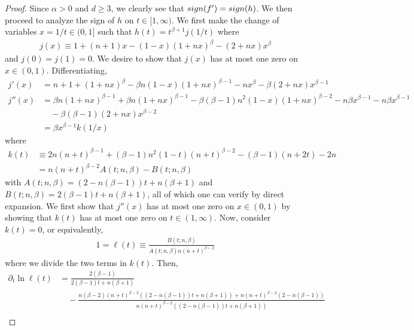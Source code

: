 \documentclass[10pt,a4paper]{amsart}
\newcommand{\p}{\partial}
\begin{document}
\begin{proof}
Since $\alpha>0$ and $d\geq 3$, we clearly see that ${\rm sign}(f')={\rm sign}(h)$. We then proceed to analyze the sign of $h$ on $t\in [1,\infty)$. We first make the change of variables $x=1/t\in (0,1]$ such that $h(t)=t^{\beta+1}j(1/t)$ where
\begin{align*}
    j(x)\equiv 1+(n+1)x-(1-x)(1+nx)^\beta -(2+nx)x^\beta 
\end{align*}
and $j(0)=j(1)=0$. We desire to show that $j(x)$ has at most one zero on $x\in (0,1)$. Differentiating,
\begin{align*}
    j'(x)&=n+1+(1+nx)^\beta -\beta n(1-x)(1+nx)^{\beta-1} -nx^\beta -\beta(2+nx)x^{\beta-1} \\
    j''(x)&=\beta n(1+nx)^{\beta-1}+\beta n (1+nx)^{\beta-1} -\beta(\beta-1)n^2 (1-x)(1+nx)^{\beta-2} -n\beta x^{\beta-1}-n\beta x^{\beta-1}\\
    &\quad -\beta(\beta-1)(2+nx)x^{\beta-2}\\
    &=\beta x^{\beta-1}k(1/x)
\end{align*}
where
\begin{align*}
    k(t)&\equiv 2n(n+t)^{\beta-1}+(\beta-1)n^2 (1-t)(n+t)^{\beta-2}-(\beta-1)(n+2t)-2n\\
    &=n(n+t)^{\beta-2}A(t;n,\beta)-B(t;n,\beta)
\end{align*}
with $A(t;n,\beta)=(2-n(\beta-1))t+n(\beta+1)$ and $B(t;n,\beta)=2(\beta-1)t+n(\beta+1)$, all of which one can verify by direct expansion.
We first show that $j''(x)$ has at most one zero on $x\in (0,1)$ by showing that $k(t)$ has at most one zero on $t\in (1,\infty)$. Now, consider $k(t)=0$, or equivalently,
\begin{align*}
    1=\ell(t)\equiv \frac{B(t;n,\beta)}{A(t;n,\beta)n(n+t)^{\beta-2}}
\end{align*}
where we divide the two terms in $k(t)$. Then, 
\begin{align*}
    \p_t \ln \ell(t)&=\frac{2(\beta-1)}{2(\beta-1)t+n(\beta+1)} \\&\quad -\frac{n(\beta-2)(n+t)^{\beta-3}((2-n(\beta-1))t+n(\beta+1))+n(n+t)^{\beta-2}(2-n(\beta-1))}{n(n+t)^{\beta-2}((2-n(\beta-1))t+n(\beta+1))}\\

\end{align*}
\end{proof}
\end{document}
